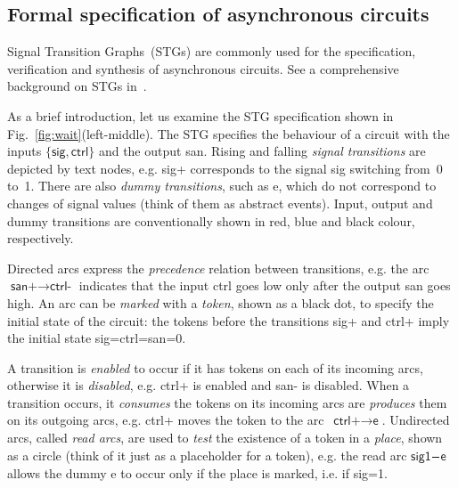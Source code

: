 \documentclass[conference]{IEEEtran}
\begin{document}

\subsection*{Formal specification of asynchronous circuits}\label{sec-stg}

Signal Transition Graphs~(STGs) are commonly used for the specification,
verification and synthesis of asynchronous circuits. See a comprehensive
background on STGs in~\cite{2002_cortadella_book}.

As a brief introduction, let us examine the STG specification shown in
Fig.~\ref{fig:wait}(left-middle). The STG specifies the behaviour
of a circuit with the inputs $\{\textsf{sig}, \textsf{ctrl}\}$
and the output \textsf{san}. Rising and falling \emph{signal transitions} are depicted by text
nodes, e.g. \textsf{sig+} corresponds to the signal \textsf{sig} switching from~0 to~1.
There are also \emph{dummy transitions}, such as \textsf{e}, which do not correspond to
changes of signal values (think of them as abstract events).
Input, output and dummy transitions are conventionally shown in red, blue and black
colour, respectively.

Directed arcs express the \emph{precedence} relation
between transitions, e.g. the arc $\textsf{san+} \longrightarrow \textsf{ctrl-}$ indicates
that the input \textsf{ctrl} goes low only after the output \textsf{san} goes high.
An arc can be \emph{marked} with a \emph{token}, shown as a black dot, to specify
the initial state of the circuit: the tokens before the transitions \textsf{sig+} and
\textsf{ctrl+} imply the initial state \textsf{sig=ctrl=san=0}.

A transition is \emph{enabled} to occur if it has tokens on each of its incoming
arcs, otherwise it is \emph{disabled}, e.g. \textsf{ctrl+} is enabled and \textsf{san-}
is disabled. When a transition occurs, it \emph{consumes} the tokens on its incoming arcs
are \emph{produces} them on its outgoing arcs, e.g. \textsf{ctrl+} moves the token to the
arc~$\textsf{ctrl+} \longrightarrow \textsf{e}$. Undirected arcs, called
\emph{read arcs}, are used to \emph{test} the existence of a token in a \emph{place}, shown as
a circle (think of it just as a placeholder for a token), e.g. the read arc
$\textsf{sig1} \frac{~~~~}{~} \textsf{e}$ allows the dummy \textsf{e} to occur only if
the place is marked, i.e. if \textsf{sig=1}.
\end{document}
